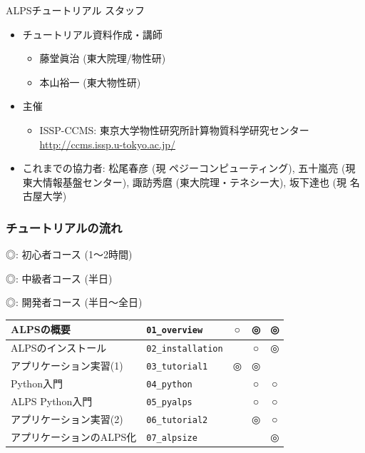 \begin{frame}[t,fragile]{ALPSチュートリアル スタッフ}
  \begin{itemize}
    \setlength{\itemsep}{1em}
  \item チュートリアル資料作成・講師
    \begin{itemize}
    \item 藤堂眞治 (東大院理/物性研)
    \item 本山裕一 (東大物性研)
    \end{itemize}
  \item 主催
    \begin{itemize}
    \item ISSP-CCMS: 東京大学物性研究所計算物質科学研究センター \url{http://ccms.issp.u-tokyo.ac.jp/} \\[2em]
    \end{itemize}
  \item これまでの協力者: 松尾春彦 (現 ペジーコンピューティング), 五十嵐亮 (現 東大情報基盤センター), 諏訪秀麿 (東大院理・テネシー大), 坂下達也 (現 名古屋大学)
  \end{itemize}
\end{frame}

\begin{frame}[t,fragile]
  \frametitle{チュートリアルの流れ}
             {\footnotesize\color{red} ◎}: 初心者コース (1〜2時間)

             {\footnotesize\color{blue} ◎}: 中級者コース (半日)

             {\footnotesize\color{green} ◎}: 開発者コース (半日〜全日) \\[1em]
             
  \begin{tabular}{|l|l|c|c|c|}
        \hline
        ALPSの概要 & {\tt 01\_overview} & {\footnotesize\color{red} ○} & {\footnotesize\color{blue} ◎} & {\footnotesize\color{green} ◎} \\
        \hline
        ALPSのインストール & {\tt 02\_installation} & {\footnotesize\color{red} } & {\footnotesize\color{blue} ○} & {\footnotesize\color{green} ◎} \\
        \hline
        アプリケーション実習(1) & {\tt 03\_tutorial1} & {\footnotesize\color{red} ◎} & {\footnotesize\color{blue} ◎} & {\footnotesize\color{green} } \\
        \hline
        Python入門 & {\tt 04\_python} & {\footnotesize\color{red}} & {\footnotesize\color{blue} ○} & {\footnotesize\color{green} ○} \\
        \hline
        ALPS Python入門 & {\tt 05\_pyalps} & {\footnotesize\color{red} } & {\footnotesize\color{blue} ○} & {\footnotesize\color{green} ○} \\
        \hline
        アプリケーション実習(2) & {\tt 06\_tutorial2} & {\footnotesize\color{red} } & {\footnotesize\color{blue} ◎} & {\footnotesize\color{green} ○} \\
        \hline
        アプリケーションのALPS化 & {\tt 07\_alpsize} & {\footnotesize\color{red} } & {\footnotesize\color{blue} } & {\footnotesize\color{green} ◎} \\
        \hline
  \end{tabular}
\end{frame}

